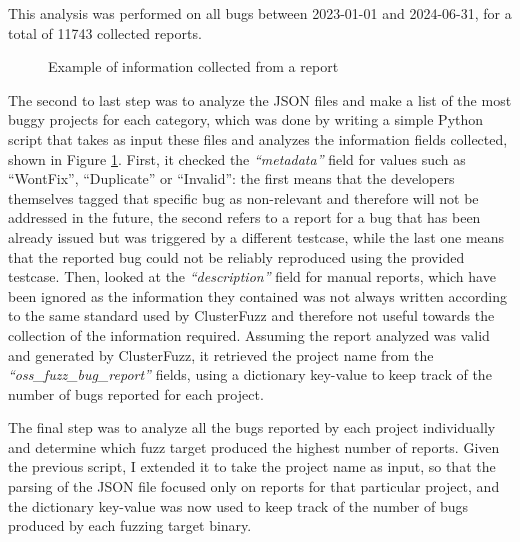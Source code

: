 This analysis was performed on all bugs between 2023-01-01 and 2024-06-31, for a total of 11743 collected reports.

\begin{figure}[h]
\caption{Example of information collected from a report}
\label{fig:report}
\end{figure}


The second to last step was to analyze the JSON files and make a list of the most buggy projects for each category, which was done by writing a simple Python script that takes as input these files and analyzes the information fields collected, shown in Figure \ref{fig:report}. First, it checked the \textit{``metadata''} field for values such as ``WontFix'', ``Duplicate'' or ``Invalid'': the first means that the developers themselves tagged that specific bug as non-relevant and therefore will not be addressed in the future, the second refers to a report for a bug that has been already issued but was triggered by a different testcase, while the last one means that the reported bug could not be reliably reproduced using the provided testcase. Then, looked at the \textit{``description''} field for manual reports, which have been ignored as the information they contained was not always written according to the same standard used by ClusterFuzz and therefore not useful towards the collection of the information required. Assuming the report analyzed was valid and generated by ClusterFuzz, it retrieved the project name from the \textit{``oss\_fuzz\_bug\_report''} fields, using a dictionary key-value to keep track of the number of bugs reported for each project. 

\newpage
The final step was to analyze all the bugs reported by each project individually and determine which fuzz target produced the highest number of reports. Given the previous script, I extended it to take the project name as input, so that the parsing of the JSON file focused only on reports for that particular project, and the dictionary key-value was now used to keep track of the number of bugs produced by each fuzzing target binary. 
\newline

